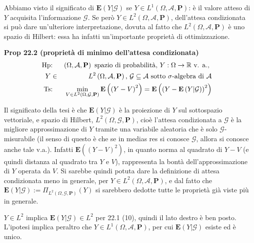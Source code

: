 \documentclass{article}
\begin{document}
Abbiamo visto il significato di $\mathbf{E}\left( Y|\mathcal{G}\right) $ se $%
Y\in L^{1}\left( \Omega ,\mathcal{A},\mathbf{P}\right) $: \`{e} il valore
atteso di $Y$ acquisita l'informazione $\mathcal{G}$. Se per\`{o} $Y\in
L^{2}\left( \Omega ,\mathcal{A},\mathbf{P}\right) $, dell'attesa
condizionata si pu\`{o} dare un'ulteriore interpretazione, dovuta al fatto
che $L^{2}\left( \Omega ,\mathcal{A},\mathbf{P}\right) $ \`{e} uno spazio di
Hilbert: essa ha infatti un'importante propriet\`{a} di ottimizzazione.

\textbf{Prop 22.2 (propriet\`{a} di minimo dell'attesa condizionata)}%
\begin{eqnarray*}
\text{Hp} &\text{: }&\left( \Omega ,\mathcal{A},\mathbf{P}\right) \text{
spazio di probabilit\`{a}, }Y:\Omega \rightarrow 
\mathbb{R}
\text{ v. a., } \\
Y &\in &L^{2}\left( \Omega ,\mathcal{A},\mathbf{P}\right) \text{, }\mathcal{%
G\subseteq A}\text{ sotto }\sigma \text{-algebra di }\mathcal{A} \\
\text{Ts} &\text{: }&\min_{V\in L^{2}\left( \Omega ,\mathcal{G},\mathbf{P}%
\right) }\mathbf{E}\left( \left( Y-V\right) ^{2}\right) =\mathbf{E}\left(
\left( Y-\mathbf{E}\left( Y|\mathcal{G}\right) \right) ^{2}\right)
\end{eqnarray*}

Il significato della tesi \`{e} che $\mathbf{E}\left( Y|\mathcal{G}\right) $ 
\`{e} la proiezione di $Y$ sul sottospazio vettoriale, e spazio di Hilbert, $%
L^{2}\left( \Omega ,\mathcal{G},\mathbf{P}\right) $, cio\`{e} l'attesa
condizionata a $\mathcal{G}$ \`{e} la migliore approssimazione di $Y$
tramite una variabile aleatoria che \`{e} solo $\mathcal{G}$-misurabile (il
senso di questo \`{e} che se in medias res si conosce $\mathcal{G}$, allora
si conosce anche tale v.a.). Infatti $\mathbf{E}\left( \left( Y-V\right)
^{2}\right) $, in quanto norma al quadrato di $Y-V$ (e quindi distanza al
quadrato tra $Y$ e $V$), rappresenta la bont\`{a} dell'approssimazione di $Y$
operata da $V$. Si sarebbe quindi potuta dare la definizione di attesa
condizionata meno in generale, per $Y\in L^{2}\left( \Omega ,\mathcal{A},%
\mathbf{P}\right) $, e dal fatto che $\mathbf{E}\left( Y|\mathcal{G}\right)
:=\Pi _{L^{2}\left( \Omega ,\mathcal{G},\mathbf{P}\right) }\left( Y\right) $
si sarebbero dedotte tutte le propriet\`{a} gi\`{a} viste pi\`{u} in
generale.

$Y\in L^{2}$ implica $\mathbf{E}\left( Y|\mathcal{G}\right) \in L^{2}$ per
22.1 (10), quindi il lato destro \`{e} ben posto. L'ipotesi implica peraltro
che $Y\in L^{1}\left( \Omega ,\mathcal{A},\mathbf{P}\right) $, per cui $%
\mathbf{E}\left( Y|\mathcal{G}\right) $ esiste ed \`{e} unico.
\end{document}
